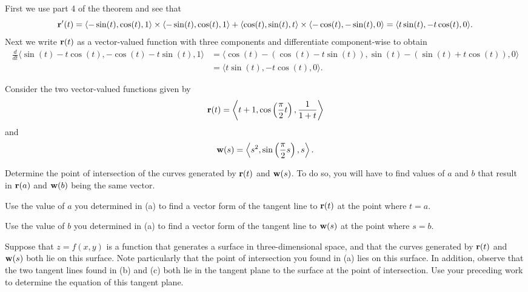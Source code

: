 \begin{exercises}
\begin{exerciseSolution}
    \item First we use part 4 of the theorem and see that 
\[\mathbf{r}'(t) = \langle -\sin(t), \cos(t), 1 \rangle \times \langle -\sin(t), \cos(t), 1 \rangle + \langle \cos(t), \sin(t), t \rangle \times \langle -\cos(t), -\sin(t), 0 \rangle = \langle t \sin(t), -t\cos(t), 0 \rangle.\]
Next we write $\mathbf{r}(t)$ as a vector-valued function with three components and differentiate component-wise to obtain
\begin{align*}
\frac{d}{dt} \langle \sin(t)-t\cos(t), -\cos(t)-t\sin(t), 1 \rangle &= \langle \cos(t) - (\cos(t)-t\sin(t)), \sin(t)-(\sin(t)+t\cos(t)), 0 \rangle \\
	&= \langle t \sin(t), -t\cos(t), 0 \rangle.
\end{align*}
     
    \ea
\end{exerciseSolution}


\item \label{Ez:9.7.2}   Consider the two vector-valued functions given by 
$$\mathbf{r}(t) = \left\langle t + 1, \cos\left(\frac{\pi}{2} t\right), \frac{1}{1+t} \right\rangle$$
and
$$\mathbf{w}(s) = \left\langle s^2, \sin\left(\frac{\pi}{2}s\right), s \right\rangle.$$ 


\ba

	\item Determine the point of intersection of the curves generated by $\mathbf{r}(t)$ and $\mathbf{w}(s)$.  To do so, you will have to find values of $a$ and $b$ that result in $\mathbf{r}(a)$ and $\mathbf{w}(b)$ being the same vector.
	
	\item Use the value of $a$ you determined in (a) to find a vector form of the tangent line to $\mathbf{r}(t)$ at the point where $t = a$.
	
	\item Use the value of $b$ you determined in (a) to find a vector form of the tangent line to $\mathbf{w}(s)$ at the point where $s = b$.
	
	\item Suppose that $z = f(x,y)$ is a function that generates a surface in three-dimensional space, and that the curves generated by $\mathbf{r}(t)$ and $\mathbf{w}(s)$ both lie on this surface.  Note particularly that the point of intersection you found in (a) lies on this surface.  In addition, observe that the two tangent lines found in (b) and (c) both lie in the tangent plane to the surface at the point of intersection.  Use your preceding work to determine the equation of this tangent plane.
\ea


\end{exercises}
